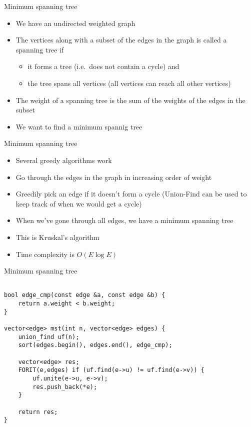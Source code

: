 \documentclass[12pt,t]{beamer}
\newcommand{\bi}{\begin{itemize}}
\newcommand{\ei}{\end{itemize}}
\begin{document}
\begin{frame}{Minimum spanning tree}
    \vspace{20pt}
    \bi
        \item We have an undirected weighted graph
        \item The vertices along with a subset of the edges in the graph is called a spanning tree if
            \bi
                \item it forms a tree (i.e.\ does not contain a cycle) and
                \item the tree spans all vertices (all vertices can reach all other vertices)
            \ei
        \vspace{10pt}
        \item The weight of a spanning tree is the sum of the weights of the edges in the subset
        \vspace{10pt}
        \item We want to find a minimum spannig tree
    \ei
\end{frame}

\begin{frame}{Minimum spanning tree}
    \vspace{20pt}
    \bi
        \item Several greedy algorithms work
        \vspace{10pt}
        \item Go through the edges in the graph in increasing order of weight
        \item Greedily pick an edge if it doesn't form a cycle (Union-Find can be used to keep track of when we would get a cycle)
        \item When we've gone through all edges, we have a minimum spanning tree
        \vspace{10pt}
        \item This is Kruskal's algorithm
        \item Time complexity is $O(E \log E)$
    \ei
\end{frame}

\begin{frame}[fragile]{Minimum spanning tree}
    \begin{verbatim}

bool edge_cmp(const edge &a, const edge &b) {
    return a.weight < b.weight;
}

vector<edge> mst(int n, vector<edge> edges) {
    union_find uf(n);
    sort(edges.begin(), edges.end(), edge_cmp);

    vector<edge> res;
    FORIT(e,edges) if (uf.find(e->u) != uf.find(e->v)) {
        uf.unite(e->u, e->v);
        res.push_back(*e);
    }

    return res;
}
    \end{verbatim}
\end{frame}
\end{document}
